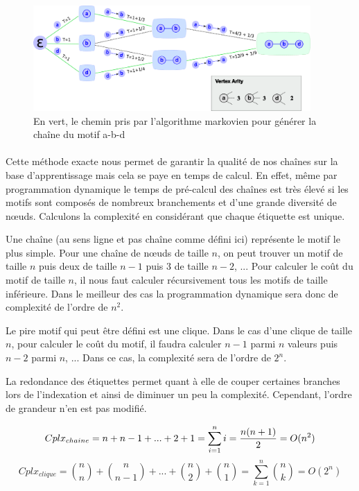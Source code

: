 \documentclass[12pt,french,twoside]{report}
\begin{document}
\begin{figure}[!ht]
  \begin{center}
    \includegraphics[width=400px]{Figures/s2m/indexation/markov.png}
    \caption{\label{markov}En vert, le chemin pris par l'algorithme markovien pour générer la chaîne du motif a-b-d}
  \end{center}
\end{figure}

\paragraph{}Cette méthode exacte nous permet de garantir la qualité de nos chaînes sur la base d'apprentissage mais cela se paye en temps de calcul.
En effet, même par programmation dynamique le temps de pré-calcul des chaînes est très élevé si les motifs sont composés de nombreux branchements et d'une grande diversité de n\oe{}uds.
Calculons la complexité en considérant que chaque étiquette est unique.

Une chaîne (au sens ligne et pas chaîne comme défini ici) représente le motif le plus simple. Pour une chaîne de n\oe{}uds de taille 
$n$, on peut trouver un motif de taille $n$ puis deux de taille $n-1$ puis 3 de taille $n-2$, ... Pour calculer le coût du motif
de taille $n$, il nous faut calculer récursivement tous les motifs de taille inférieure. Dans le meilleur des cas la programmation
dynamique sera donc de complexité de l'ordre de $n^2$.

Le pire motif qui peut être défini est une clique. Dans le cas d'une clique de taille $n$, pour calculer le coût du motif, il faudra
calculer $n-1$ parmi $n$ valeurs puis $n-2$ parmi $n$, ... Dans ce cas, la complexité sera de l'ordre de $2^n$.

La redondance des étiquettes permet quant à elle de couper certaines branches lors de l'indexation et ainsi de diminuer un peu
la complexité. Cependant, l'ordre de grandeur n'en est pas modifié.

\begin{equation}
 Cplx_{chaine} = n + n-1 + ... + 2 + 1 = \sum_{i=1}^n i = {{n (n+1)} \over 2} = O(n^2)
\end{equation}
\begin{equation}
 Cplx_{clique} = {n \choose n} + {n \choose n-1} + ... + {n \choose 2} + {n \choose 1} = \sum_{k=1}^n {n \choose k} = O(2^n)
\end{equation}
\end{document}
